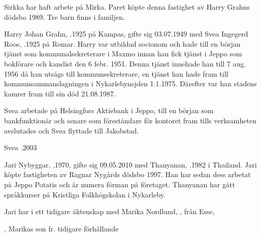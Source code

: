 

Sirkka har haft arbete på Mirka. Paret köpte denna fastighet av Harry Grahns dödsbo 1989. Tre barn finns i familjen.
\begin{jhchildren}
  \item {}
  \item {}
  \item {}
\end{jhchildren}


Harry Johan Grahn, .1925 på Kampas, gifte sig 03.07.1949 med Svea Ingegerd Roos, .1925 på Romar. Harry var utbildad socionom och hade till en början tjänst som kommunalsekreterare i Maxmo innan han fick tjänst i Jeppo som bokförare och kanslist den 6 febr. 1951. Denna tjänst innehade han till 7 aug. 1956 då han utsågs till kommunsekreterare, en tjänst han hade fram till kommunsammanslagningen i Nykarlebynejden 1.1.1975. Därefter var han stadens kamrer fram till sin död 21.08.1987.

Svea arbetade på Helsingfors Aktiebank i Jeppo, till en början som bankfunktionär och senare som föreståndare för kontoret fram tills verksamheten avslutades och Svea flyttade till Jakobstad.
\begin{jhchildren}
  \item {}
  \item {}
  \item {}
\end{jhchildren}

Svea .2003




Jari  Nybyggar, .1970, gifte sig 09.05.2010 med Thanyanan, .1982 i Thailand. Jari köpte fastigheten av Ragnar Nygårds dödsbo 1997. Han har sedan dess arbetat på Jeppo Potatis och är numera förman på företaget. Thanyanan har gått språkkurser på Kristliga Folkhögskolan i Nykarleby.



Jari har i ett tidigare äktenskap med Marika Nordlund, , från Esse,
\begin{jhchildren}
  \item {}
  \item {}
  \item {}
  \item {}, Marikas son fr. tidigare förhållande
\end{jhchildren}


